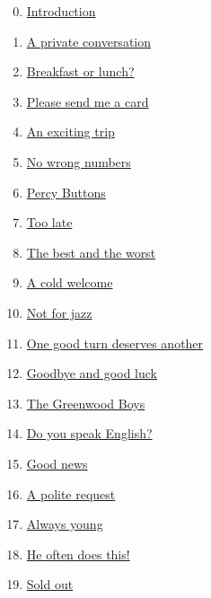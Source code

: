 \documentclass[11pt]{article}
\begin{document}
\begin{multicols}{2}
	\begin{enumerate}
		\setcounter{enumi}{-1}
		\item \href{https://mp.weixin.qq.com/s/NPIaPpjjzJNXyYPf623xag}{Introduction}	%
		\item \href{https://mp.weixin.qq.com/s/B8mT3rjtlzJsJsTDIDkgRg}{A private conversation}	%
		\item \href{https://mp.weixin.qq.com/s/2_UKnq7CTIShtpyxn3Aj5A}{Breakfast or lunch?}	%
		\item \href{https://mp.weixin.qq.com/s/7IWBmvVuL_AVnfYpE1x3WA}{Please send me a card}	%
		\item \href{https://mp.weixin.qq.com/s/HKLw-bUPzLX0HHL-gln58w}{An exciting trip}	%
		\item \href{https://mp.weixin.qq.com/s/VSvo1-8ezwWxcEBahOxgGQ}{No wrong numbers}	%
		\item \href{https://mp.weixin.qq.com/s/Pa2C7xnccwNq1V0Tgt0_bQ}{Percy Buttons}	%
		\item \href{https://mp.weixin.qq.com/s/3VYqwLXvfzjgKSTlR-agbw}{Too late}	%
		\item \href{https://mp.weixin.qq.com/s/lUI0yXq-63gDEOp6qJ8UCA}{The best and the worst}	%
		\item \href{https://mp.weixin.qq.com/s/Z1AinTHKM98GuaJ_hK0odA}{A cold welcome}	%
		\item \href{https://mp.weixin.qq.com/s/DgluateiJsy4mJcNsTUXaQ}{Not for jazz}	%
		\item \href{https://mp.weixin.qq.com/s/Jb33ejgBO9dOSnbmRVVjag}{One good turn deserves another}	%
		\item \href{https://mp.weixin.qq.com/s/VIBQQRJnYFPA8E86U-j9yA}{Goodbye and good luck}	%
		\item \href{https://mp.weixin.qq.com/s/Z7jCKq2pK22H-XRzy2ywUw}{The Greenwood Boys}	%
		\item \href{https://mp.weixin.qq.com/s/rKKghKCvSBcENNvzRfuhgA}{Do you speak English?}	%
		\item \href{https://mp.weixin.qq.com/s/kE9qX26eYJlnyY28BfNK4w}{Good news}	%
		\item \href{https://mp.weixin.qq.com/s/L-ZBNxJvwkIpepWQOAvtaw}{A polite request}	%
		\item \href{https://mp.weixin.qq.com/s/PGWWM3tYLX6X3UP12ebYRg}{Always young}	%
		\item \href{https://mp.weixin.qq.com/s/WC4vxA6SL6Pd6VU9vJbkXg}{He often does this!}	%
		\item \href{https://mp.weixin.qq.com/s/JrrvbZ2Oi6TYCjyDc4LttQ}{Sold out}	%

\end{enumerate}
\end{multicols}
\end{document}

